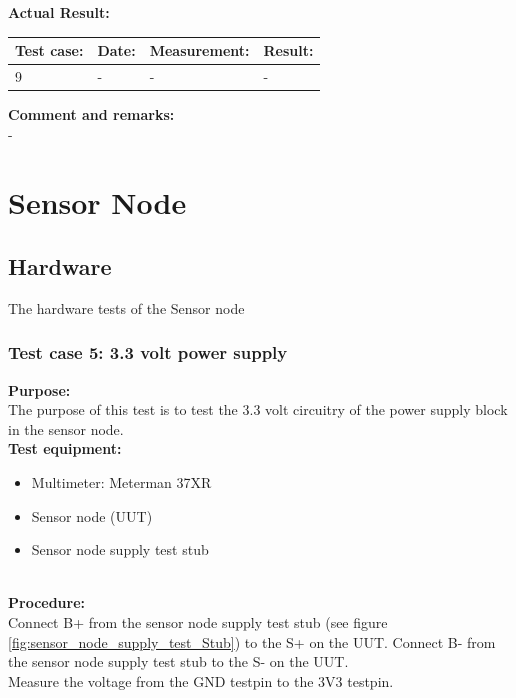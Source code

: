\textbf{Actual Result:}\\
\begin{table}[H]
\centering
\begin{tabular}{|p{2cm}|p{2cm}|p{3cm}|p{2cm}|}\hline
\textbf{Test case:} & \textbf{Date:} & \textbf{Measurement:} & \textbf{Result:} \\ \hline
9 & - & - & - \\ \hline
\end{tabular}
\end{table}

\textbf{Comment and remarks:}\\
-\\

\section{Sensor Node}
\subsection{Hardware}
The hardware tests of the Sensor node
\subsubsection{Test case 5: 3.3 volt power supply}
\textbf{Purpose:}\\
The purpose of this test is to test the 3.3 volt circuitry of the power supply block in the sensor node.\\

\textbf{Test equipment:}
\begin{itemize}
\item Multimeter: Meterman 37XR
\item Sensor node (UUT)
\item Sensor node supply test stub
\end{itemize}
\ \\
\textbf{Procedure:}\\
Connect B+ from the sensor node supply test stub (see figure \ref{fig:sensor_node_supply_test_Stub}) to the S+ on the UUT. Connect B- from the sensor node supply test stub to the S- on the UUT.\\
Measure the voltage from the GND testpin to the 3V3 testpin.

